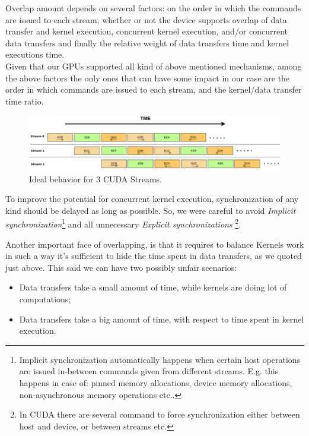 	Overlap amount depends on several factors: on the order in which the commands are issued to each stream, whether or not the device supports overlap of data transfer and kernel execution, concurrent kernel execution, and/or concurrent data transfers and finally the relative weight of data transfers time and kernel executions time.\\
	Given that our GPUs supported all kind of above mentioned mechanisms, among the above factors the only ones that can have some impact in our case are the order in which commands are issued to each stream, and the kernel/data transfer time ratio.\\
	\begin{figure}	
		\includegraphics[width=\linewidth]{images/3Streams.jpg}
		\caption{Ideal behavior for 3 CUDA Streams.}
		\label{fig:threeStreams}
	\end{figure}

	To improve the potential for concurrent kernel execution, synchronization of any kind should be delayed as long as possible.
	So, we were careful to avoid \textit{Implicit synchronization}\footnote{Implicit synchronization automatically happens when certain host operations are issued in-between commands given from different streams. E.g. this happens in case of: pinned memory allocations, device memory allocations, non-asynchronous memory operations etc.\cite{cudastrandconcurr}.} and all unnecessary \textit{Explicit synchronizations} \footnote{In CUDA there are several command to force synchronization either between host and device, or between streams etc.}.
	
	Another important face of overlapping, is that it requires to balance Kernels work in such a way it's sufficient to hide the time spent in data transfers, as we quoted just above. 
	This said we can have two possibly unfair scenarios:
	\begin{itemize}
		\item Data transfers take a small amount of time, while kernels are doing lot of computations;
		
		\item Data transfers take a big amount of time, with respect to time spent in kernel execution.
	\end{itemize}
	
